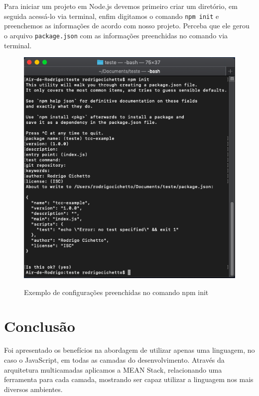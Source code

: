 \documentclass[
	12pt,				%
	openright,			%
	twoside,			%
	a4paper,			%
	english,			%
	brazil				%
	]{abntex2}
\begin{document}
Para iniciar um projeto em Node.js devemos primeiro criar um diretório, em seguida acessá-lo via terminal, enfim digitamos o comando \verb|npm init| e preenchemos as informações de acordo com nosso projeto. Perceba que ele gerou o arquivo \verb|package.json| com as informações preenchidas no comando via terminal.

\begin{figure}[h]
	\centering

  \caption{Exemplo de configurações preenchidas no comando npm init} \label{fig:NpmInitExample}
    \includegraphics[scale=0.5]{npm-init-example} \\

\end{figure}

\chapter{Conclusão}
Foi apresentado os benefícios na abordagem de utilizar apenas uma linguagem, no caso o JavaScript, em todas as camadas do desenvolvimento. Através da arquitetura multicamadas aplicamos a MEAN Stack, relacionando uma ferramenta para cada camada, mostrando ser capaz utilizar a linguagem nos mais diversos ambientes.
\end{document}

